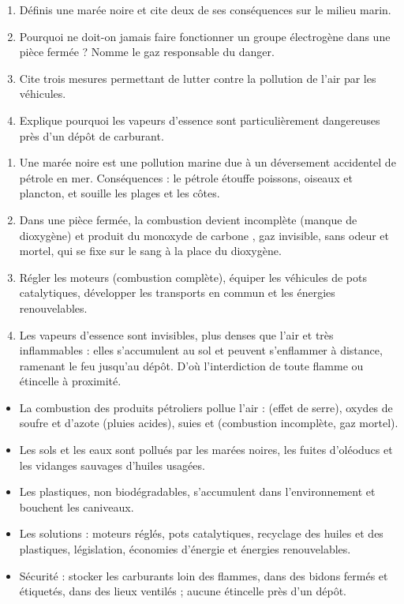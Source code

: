 \documentclass[11pt]{article}
\newcommand{\cle}[1]{{\popxbold\color{popdark}#1}}
\begin{document}
\begin{exercice}
\begin{enumerate}
\item Définis une marée noire et cite deux de ses conséquences sur le milieu marin.
\item Pourquoi ne doit-on jamais faire fonctionner un groupe électrogène dans une pièce fermée ? Nomme le gaz responsable du danger.
\item Cite trois mesures permettant de lutter contre la pollution de l'air par les véhicules.
\item Explique pourquoi les vapeurs d'essence sont particulièrement dangereuses près d'un dépôt de carburant.
\end{enumerate}
\end{exercice}

\begin{corrige}
\begin{enumerate}
\item Une marée noire est une pollution marine due à un déversement accidentel de pétrole en mer. Conséquences : le pétrole étouffe poissons, oiseaux et plancton, et souille les plages et les côtes.
\item Dans une pièce fermée, la combustion devient incomplète (manque de dioxygène) et produit du \cle{monoxyde de carbone} , gaz invisible, sans odeur et mortel, qui se fixe sur le sang à la place du dioxygène.
\item Régler les moteurs (combustion complète), équiper les véhicules de pots catalytiques, développer les transports en commun et les énergies renouvelables.
\item Les vapeurs d'essence sont invisibles, plus denses que l'air et très inflammables : elles s'accumulent au sol et peuvent s'enflammer à distance, ramenant le feu jusqu'au dépôt. D'où l'interdiction de toute flamme ou étincelle à proximité.
\end{enumerate}
\end{corrige}

\begin{aretenir}
\begin{itemize}
\item La combustion des produits pétroliers pollue l'air :  (effet de serre), oxydes de soufre et d'azote (pluies acides), suies et  (combustion incomplète, gaz mortel).
\item Les sols et les eaux sont pollués par les marées noires, les fuites d'oléoducs et les vidanges sauvages d'huiles usagées.
\item Les plastiques, non biodégradables, s'accumulent dans l'environnement et bouchent les caniveaux.
\item Les solutions : moteurs réglés, pots catalytiques, recyclage des huiles et des plastiques, législation, économies d'énergie et énergies renouvelables.
\item Sécurité : stocker les carburants loin des flammes, dans des bidons fermés et étiquetés, dans des lieux ventilés ; aucune étincelle près d'un dépôt.
\end{itemize}
\end{aretenir}
\end{document}
